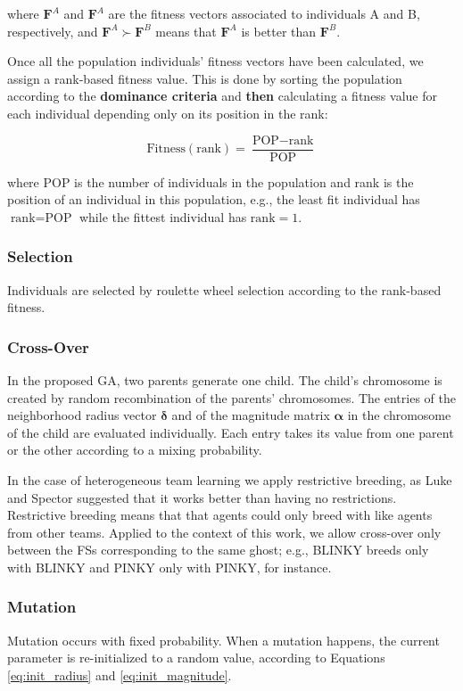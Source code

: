 \documentclass[journal]{IEEEtran}
\begin{document}
where $\mathbf{F}^A$ and $\mathbf{F}^A$ are the fitness vectors associated to individuals A and B, respectively, and $\mathbf{F}^A \succ \mathbf{F}^B$ means that $\mathbf{F}^A$ is better than $\mathbf{F}^B$.

Once all the population individuals' fitness vectors have been calculated, we assign a rank-based fitness value. This is done by sorting the population according to the \textbf{dominance criteria} and \textbf{then} calculating a fitness value for each individual depending only on its position in the rank:

\begin{equation}
\label{eq:rankFitness}
	\text{Fitness}(\text{rank}) = \frac{\text{POP} - \text{rank}}{\text{POP}}
\end{equation}

where POP is the number of individuals in the population and rank is the position of an individual in this population, e.g., the least fit individual has $\text{rank} = \text{POP}$ while the fittest individual has $\text{rank} = 1$.

\subsubsection{Selection}
Individuals are selected by roulette wheel selection according to the rank-based fitness.

\subsubsection{Cross-Over}
In the proposed GA, two parents generate one child. The child's chromosome is created by random recombination of the parents' chromosomes. The entries of the neighborhood radius vector $\boldsymbol\delta$ and of the magnitude matrix $\boldsymbol\alpha$ in the chromosome of the child are evaluated individually. Each entry takes its value from one parent or the other according to a mixing probability.

In the case of heterogeneous team learning we apply restrictive
breeding, as Luke and Spector \cite{Luke1996} suggested that it works
better than having no restrictions. Restrictive breeding means that
that agents could only breed with like agents from other
teams. Applied to the context of this work, we allow cross-over only
between the FSs corresponding to the same ghost; e.g., BLINKY breeds
only with BLINKY and PINKY only with PINKY, for instance.

\subsubsection{Mutation}
Mutation occurs with fixed probability. When a mutation happens, the current parameter is re-initialized to a random value, according to Equations \eqref{eq:init_radius} and \eqref{eq:init_magnitude}.
\end{document}
